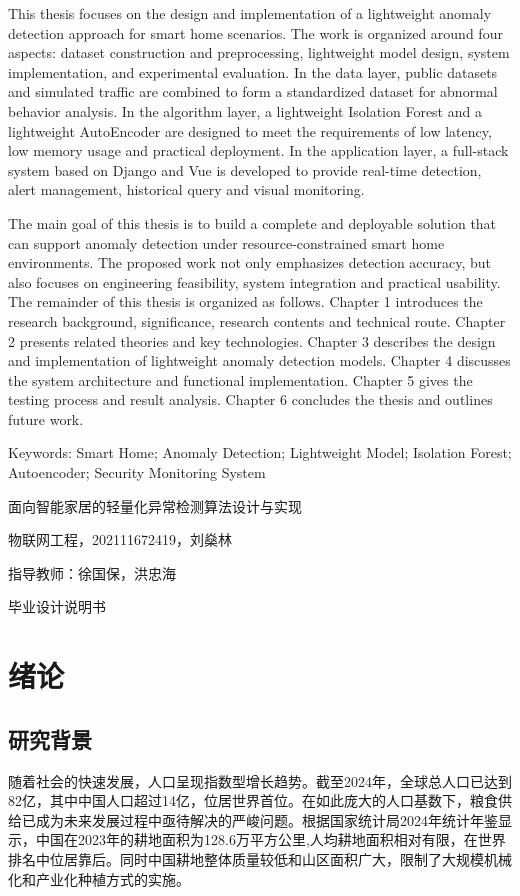 \documentclass[12pt, a4paper, twoside]{ctexart}
\begin{document}
This thesis focuses on the design and implementation of a lightweight anomaly detection approach for smart home scenarios. The work is organized around four aspects: dataset construction and preprocessing, lightweight model design, system implementation, and experimental evaluation. In the data layer, public datasets and simulated traffic are combined to form a standardized dataset for abnormal behavior analysis. In the algorithm layer, a lightweight Isolation Forest and a lightweight AutoEncoder are designed to meet the requirements of low latency, low memory usage and practical deployment. In the application layer, a full-stack system based on Django and Vue is developed to provide real-time detection, alert management, historical query and visual monitoring.

The main goal of this thesis is to build a complete and deployable solution that can support anomaly detection under resource-constrained smart home environments. The proposed work not only emphasizes detection accuracy, but also focuses on engineering feasibility, system integration and practical usability. The remainder of this thesis is organized as follows. Chapter 1 introduces the research background, significance, research contents and technical route. Chapter 2 presents related theories and key technologies. Chapter 3 describes the design and implementation of lightweight anomaly detection models. Chapter 4 discusses the system architecture and functional implementation. Chapter 5 gives the testing process and result analysis. Chapter 6 concludes the thesis and outlines future work.

Keywords: Smart Home; Anomaly Detection; Lightweight Model; Isolation Forest; Autoencoder; Security Monitoring System

面向智能家居的轻量化异常检测算法设计与实现

物联网工程，202111672419，刘燊林

指导教师：徐国保，洪忠海

毕业设计说明书


\chapter{绪论}


\section{研究背景}

随着社会的快速发展，人口呈现指数型增长趋势。截至2024年，全球总人口已达到82亿，其中中国人口超过14亿，位居世界首位。在如此庞大的人口基数下，粮食供给已成为未来发展过程中亟待解决的严峻问题。根据国家统计局2024年统计年鉴显示，中国在2023年的耕地面积为128.6万平方公里,人均耕地面积相对有限，在世界排名中位居靠后。同时中国耕地整体质量较低和山区面积广大，限制了大规模机械化和产业化种植方式的实施。
\end{document}
